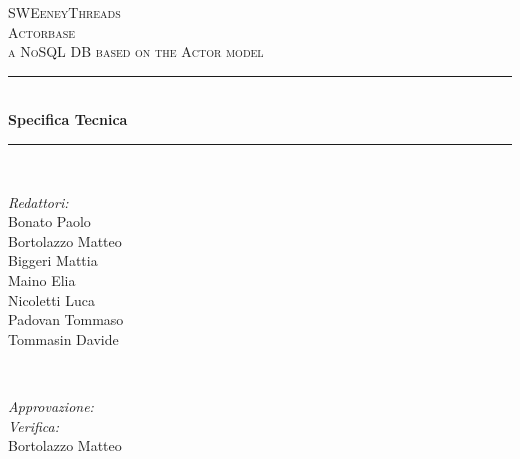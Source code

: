 \documentclass[a4paper]{article}
\begin{document}
	
	\begin{titlepage}
		\newcommand{\HRule}{\rule{\linewidth}{0.5mm}} 
		\center  
		
		\textsc{\LARGE SWEeneyThreads}\\[1.5cm] 
		\textsc{\Large Actorbase}\\[0.5cm] 
		\textsc{\large a NoSQL DB based on the Actor model}\\[0.5cm]
		
		
		\HRule \\[0.4cm]
		{ \huge \bfseries Specifica Tecnica}\\[0.4cm] 
		\HRule \\[1.5cm]
		
		\begin{minipage}{0.4\textwidth}
			\begin{flushleft} \large
				\emph{Redattori:}\\
				Bonato Paolo \\
				Bortolazzo Matteo \\
				Biggeri Mattia \\
				Maino Elia \\
				Nicoletti Luca  \\
				Padovan Tommaso \\
				Tommasin Davide
			\end{flushleft}
		\end{minipage}
		~
		\begin{minipage}{0.4\textwidth}
			\begin{flushright} \large
				\emph{Approvazione:} \\
				\emph{Verifica:} \\
                    Bortolazzo Matteo\\
				 
			\end{flushright}
		\end{minipage}
		

\end{titlepage}
\end{document}
